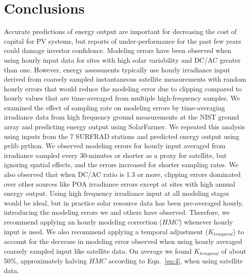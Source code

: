 \documentclass[conference]{IEEEtran}
\begin{document}
\section{Conclusions}
Accurate predictions of energy output are important for decreasing the cost of capital for PV systems, but reports of under-performance for the past few years could damage investor confidence. Modeling errors have been observed when using hourly input data for sites with high solar variability and DC/AC greater than one. However, energy assessments typically use hourly irradiance input derived from coarsely sampled instantaneous satellite measurements with random hourly errors that would reduce the modeling error due to clipping compared to hourly values that are time-averaged from multiple high-frequency samples. We examined the effect of sampling rate on modeling errors by time-averaging irradiance data from high frequency ground measurements at the NIST ground array and predicting energy output using SolarFarmer. We repeated this analysis using inputs from the 7 SURFRAD stations and predicted energy output using pvlib python. We observed modeling errors for hourly input averaged from irradiance sampled every 30-minutes or shorter as a proxy for satellite, but ignoring spatial effects, and the errors increased for shorter sampling rates. We also observed that when DC/AC ratio is 1.3 or more, clipping errors dominated over other sources like POA irradiance errors except at sites with high annual energy output. Using high frequency irradiance input at all modeling stages would be ideal, but in practice solar resource data has been pre-averaged hourly, introducing the modeling errors we and others have observed. Therefore, we recommend applying an hourly modeling correction ($\mathit{HMC}$) whenever hourly input is used. We also recommend applying a temporal adjustment ($K_{temporal}$) to account for the decrease in modeling error observed when using hourly averaged coarsely sampled input like satellite data. On average we found $K_{temporal}$ of about 50\%, approximately halving $\mathit{HMC}$ according to Eqn.~\ref{eq:4}, when using satellite data.



\balance
\end{document}
